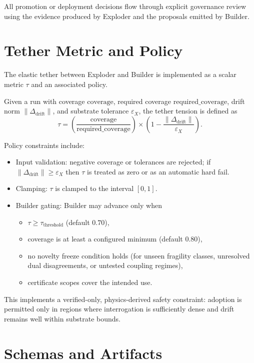 \documentclass[11pt]{article}
\begin{document}
All promotion or deployment decisions flow through explicit governance review using the evidence produced by Exploder and the proposals emitted by Builder.

\section{Tether Metric and Policy}

The elastic tether between Exploder and Builder is implemented as a scalar metric \(\tau\) and an associated policy.

Given a run with coverage \(\mathrm{coverage}\), required coverage \(\mathrm{required\_coverage}\), drift norm \(\|\Delta_{\mathrm{drift}}\|\), and substrate tolerance \(\varepsilon_X\), the tether tension is defined as
\begin{equation}
\tau = \left( \frac{\mathrm{coverage}}{\mathrm{required\_coverage}} \right)
       \times \left( 1 - \frac{\|\Delta_{\mathrm{drift}}\|}{\varepsilon_X} \right).
\end{equation}

Policy constraints include:
\begin{itemize}
  \item Input validation: negative coverage or tolerances are rejected; if \(\|\Delta_{\mathrm{drift}}\| \ge \varepsilon_X\) then \(\tau\) is treated as zero or as an automatic hard fail.
  \item Clamping: \(\tau\) is clamped to the interval \([0,1]\).
  \item Builder gating: Builder may advance only when
  \begin{itemize}
    \item \(\tau \ge \tau_{\mathrm{threshold}}\) (default \(0.70\)),
    \item coverage is at least a configured minimum (default \(0.80\)),
    \item no novelty freeze condition holds (for unseen fragility classes, unresolved dual disagreements, or untested coupling regimes),
    \item certificate scopes cover the intended use.
  \end{itemize}
\end{itemize}

This implements a verified-only, physics-derived safety constraint: adoption is permitted only in regions where interrogation is sufficiently dense and drift remains well within substrate bounds.

\section{Schemas and Artifacts}
\end{document}
